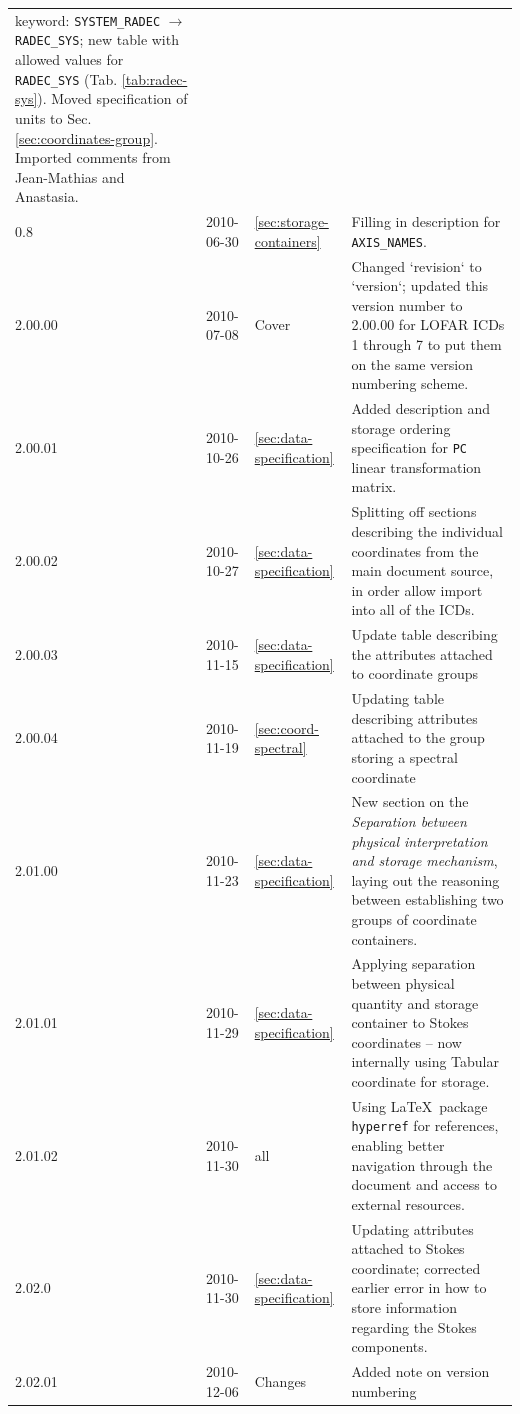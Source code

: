 \documentclass[a4paper,10pt,bibtotoc]{scrreprt}
\begin{document}
\begin{center}
\begin{supertabular}{lllp{10cm}}
    keyword: \verb|SYSTEM_RADEC| $\rightarrow$ \verb|RADEC_SYS|; new
    table with allowed values for \verb|RADEC_SYS|
    (Tab. \ref{tab:radec-sys}). Moved specification of units to
    Sec. \ref{sec:coordinates-group}. Imported comments from
    Jean-Mathias and Anastasia. \\
    0.8 & 2010-06-30 & \ref{sec:storage-containers} & Filling in
    description for \verb|AXIS_NAMES|. \\
    2.00.00 & 2010-07-08 & Cover & Changed `revision` to `version`;  updated 
    this version number to 2.00.00 for LOFAR ICDs 1 through 7 to put them on the same
    version numbering scheme. \\
    2.00.01 & 2010-10-26 & \ref{sec:data-specification} & Added
    description and storage ordering specification for \texttt{PC}
    linear transformation matrix. \\
    2.00.02 & 2010-10-27 & \ref{sec:data-specification} & Splitting
    off sections describing the individual coordinates from the main
    document source, in order allow import into all of the ICDs. \\
    2.00.03 & 2010-11-15 & \ref{sec:data-specification} & Update table
    describing the attributes attached to coordinate groups \\
    2.00.04 & 2010-11-19 & \ref{sec:coord-spectral} & Updating table
    describing attributes attached to the group storing a spectral
    coordinate \\
    2.01.00 & 2010-11-23 & \ref{sec:data-specification} & New section
    on the \textsl{Separation between physical interpretation and
      storage mechanism}, laying out the reasoning between
    establishing two groups of coordinate containers. \\
    2.01.01 & 2010-11-29 & \ref{sec:data-specification} & Applying
    separation between physical quantity and storage container to
    Stokes coordinates -- now internally using Tabular coordinate for
    storage. \\
    2.01.02 & 2010-11-30 & all & Using \LaTeX\ package
    \texttt{hyperref} for references, enabling better navigation
    through the document and access to external resources. \\
    2.02.0 & 2010-11-30 & \ref{sec:data-specification} & Updating
    attributes attached to Stokes coordinate; corrected earlier error
    in how to store information regarding the Stokes components. \\
    2.02.01 & 2010-12-06 & Changes & Added note on version numbering

\end{supertabular}
\end{center}
\end{document}
